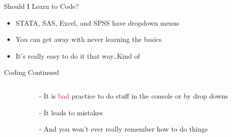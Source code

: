 \documentclass[shownotes,12pt, aspectratio=169]{beamer}
\newenvironment{wideitemize}{\itemize\addtolength{\itemsep}{10pt}}{\enditemize}
\begin{document}
\begin{frame}[t]{Should I Learn to Code?}
\begin{itemize}
  \item STATA, SAS, Excel, and SPSS have dropdown menus
  \pause
  \item You can get away with never learning the basics
  \pause
  \item It's really easy to do it that way..Kind of
\end{itemize}
\end{frame}
\begin{frame}[t]{Coding Continued}
\begin{columns}
\begin{column}[T]{0.5\textwidth}
\end{column}
\hfill
\begin{column}[T]{0.5\textwidth}
  \begin{wideitemize}
     \item[-] It is \textcolor{red}{bad} practice to do stuff in the console or by drop downs
     \item[-] It leads to mistakes
     \item[-] And you won't ever really remember how to do things
   \end{wideitemize}
\end{column}
\end{columns}

\end{frame}
\end{document}

